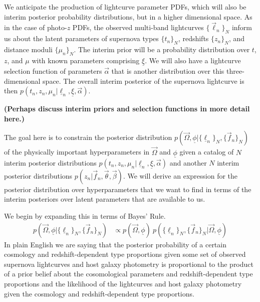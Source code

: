 \documentclass[12pt, onecolumn]{emulateapj}
\newcommand{\textul}{\underline}
\begin{document}
We anticipate the production of lightcurve parameter PDFs, which will also be interim posterior probability distributions, but in a higher dimensional space.  As in the case of photo-$z$ PDFs, the observed multi-band lightcurves $\{\vec{\ell}_{n}\}_{N}$ inform us about the latent parameters of supernova types $\{t_{n}\}_{N}$, redshifts $\{z_{n}\}_{N}$, and distance moduli $\{\mu_{n}\}_{N}$.  The interim prior will be a probability distribution over $t$, $z$, and $\mu$ with known parameters comprising $\textul{\xi}$.  We will also have a lightcurve selection function of parameters $\vec{\alpha}$ that is another distribution over this three-dimensional space.  The overall interim posterior of the supernova lightcurve is then $p(t_{n}, z_{n}, \mu_{n} | \textul{\ell}_{n}, \textul{\xi}, \vec{\alpha})$.

\textbf{(Perhaps discuss interim priors and selection functions in more detail here.)}

The goal here is to constrain the posterior distribution $p(\vec{\Omega}, \textul{\phi} | \{\textul{\ell}_{n}\}_{N}, \{\vec{f}_{n}\}_{N})$ of the physically important hyperparameters in $\vec{\Omega}$ and $\textul{\phi}$ given a catalog of $N$ interim posterior distributions $p(t_{n}, z_{n}, \mu_{n} | \textul{\ell}_{n}, \textul{\xi}, \vec{\alpha})$ and another $N$ interim posterior distributions $p(z_{n} | \vec{f}_{n}, \vec{\theta}, \vec{\beta})$.  We will derive an expression for the posterior distribution over hyperparameters that we want to find in terms of the interim posteriors over latent parameters that are available to us.

We begin by expanding this in terms of Bayes' Rule.
\begin{align}
\label{eq:bayes}
p(\vec{\Omega}, \textul{\phi} | \{\textul{\ell}_{n}\}_{N}, \{\vec{f}_{n}\}_{N}) &\propto p(\vec{\Omega}, \textul{\phi})\ p(\{\textul{\ell}_{n}\}_{N}, \{\vec{f}_{n}\}_{N} | \vec{\Omega}, \textul{\phi})
\end{align}
In plain English we are saying that the posterior probability of a certain cosmology and redshift-dependent type proportions given some set of observed supernova lightcurves and host galaxy photometry is proportional to the product of a prior belief about the cosomological parameters and redshift-dependent type proportions and the likelihood of the lightcurves and host galaxy photometry given the cosmology and redshift-dependent type proportions.
\end{document}
